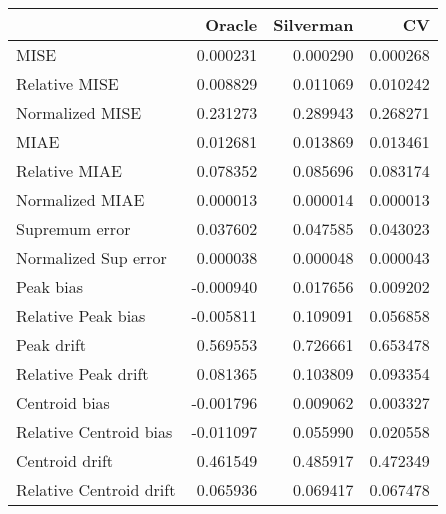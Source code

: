 \begin{tabular}{lrrr}
  \toprule
 & Oracle & Silverman & CV \\ 
  \midrule
MISE & 0.000231 & 0.000290 & 0.000268 \\ 
  Relative MISE & 0.008829 & 0.011069 & 0.010242 \\ 
  Normalized MISE & 0.231273 & 0.289943 & 0.268271 \\ 
  MIAE & 0.012681 & 0.013869 & 0.013461 \\ 
  Relative MIAE & 0.078352 & 0.085696 & 0.083174 \\ 
  Normalized MIAE & 0.000013 & 0.000014 & 0.000013 \\ 
  Supremum error & 0.037602 & 0.047585 & 0.043023 \\ 
  Normalized Sup error & 0.000038 & 0.000048 & 0.000043 \\ 
  Peak bias & -0.000940 & 0.017656 & 0.009202 \\ 
  Relative Peak bias & -0.005811 & 0.109091 & 0.056858 \\ 
  Peak drift & 0.569553 & 0.726661 & 0.653478 \\ 
  Relative Peak drift & 0.081365 & 0.103809 & 0.093354 \\ 
  Centroid bias & -0.001796 & 0.009062 & 0.003327 \\ 
  Relative Centroid bias & -0.011097 & 0.055990 & 0.020558 \\ 
  Centroid drift & 0.461549 & 0.485917 & 0.472349 \\ 
  Relative Centroid drift & 0.065936 & 0.069417 & 0.067478 \\ 
   \bottomrule
\end{tabular}
